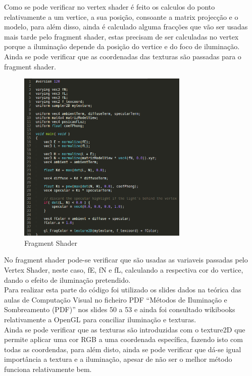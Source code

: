 \documentclass[portugues,final]{revdetua}
\begin{document}
Como se pode verificar no vertex shader é feito os calculos do ponto relativamente a um vertice, a sua posição, consoante a matrix projecção e o modelo, para além disso, ainda é calculado alguma fracções que vão ser usadas mais tarde pelo fragment shader, estas precisam de ser calculadas no vertex porque a iluminação depende da posição do vertice e do foco de iluminação.\\

Ainda se pode verificar que as coordenadas das texturas são passadas para o fragment shader.

\begin{figure}[H]
\centerline{\includegraphics[width=230pt]{images/fragmentshader.png}}
\caption{Fragment Shader}
\label{img:complete}
\end{figure}

No fragment shader pode-se verificar que são usadas as variaveis passadas pelo Vertex Shader, neste caso, fE, fN e fL, calculando a respectiva cor do vertice, dando o efeito de iluminação pretendido.\\

Para realizar esta parte do código foi utilizado os slides dados na teórica das aulas de Computação Visual no ficheiro PDF ``Métodos de Iluminação e Sombreamento (PDF)''\cite{shadingAulas} nos slides 50 a 53 e ainda foi consultado wikibooks relativamente a OpenGL para conciliar iluminação e texturas\cite{lightningsurfaces}.\\

Ainda se pode verificar que as texturas são introduzidas\cite{textures} com o texture2D que permite aplicar uma cor RGB a uma coordenada específica, fazendo isto com todas as coordendas, para além disto, ainda se pode verificar que dá-se igual importância a textura e a iluminação, apesar de não ser o melhor método funciona relativamente bem.
\end{document}
